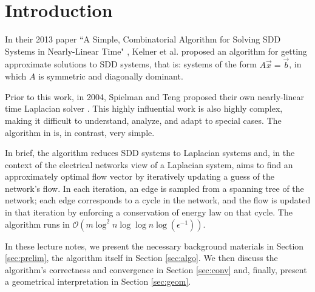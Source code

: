 \section{Introduction}

In their 2013 paper ``A Simple, Combinatorial Algorithm for Solving SDD Systems in Nearly-Linear Time" \cite{Kel13}, Kelner et al. proposed an algorithm for getting approximate solutions to SDD systems, that is: systems of the form $A\vec x = \vec b$, in which $A$ is symmetric and diagonally dominant. 

Prior to this work, in 2004, Spielman and Teng proposed their own nearly-linear time Laplacian solver \cite{ST04}. This highly influential work is also highly complex, making it difficult to understand, analyze, and adapt to special cases. The algorithm in \cite{Kel13} is, in contrast, very simple. 

In brief, the algorithm reduces SDD systems to Laplacian systems and, in the context of the electrical networks view of a Laplacian system, aims to find an approximately optimal flow vector by iteratively updating a guess of the network's flow. In each iteration, an edge is sampled from a spanning tree of the network; each edge corresponds to a cycle in the network, and the flow is updated in that iteration by enforcing a conservation of energy law on that cycle. The algorithm runs in $\mathcal O(m \log^2 n \log \log n \log(\epsilon^{-1}))$. 

In these lecture notes, we present the necessary background materials in Section \ref{sec:prelim}, the algorithm itself in Section \ref{sec:algo}. We then discuss the algorithm's correctness and convergence in Section \ref{sec:conv} and, finally, present a geometrical interpretation in Section \ref{sec:geom}.
